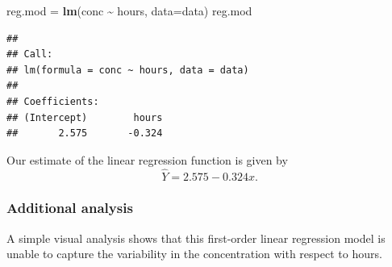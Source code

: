 \documentclass[
]{article}
\newenvironment{Shaded}{\begin{snugshade}}{\end{snugshade}}
\newcommand{\AttributeTok}[1]{\textcolor[rgb]{0.13,0.29,0.53}{#1}}
\newcommand{\DecValTok}[1]{\textcolor[rgb]{0.00,0.00,0.81}{#1}}
\newcommand{\FunctionTok}[1]{\textcolor[rgb]{0.13,0.29,0.53}{\textbf{#1}}}
\newcommand{\NormalTok}[1]{#1}
\newcommand{\OtherTok}[1]{\textcolor[rgb]{0.56,0.35,0.01}{#1}}
\newcommand{\SpecialCharTok}[1]{\textcolor[rgb]{0.81,0.36,0.00}{\textbf{#1}}}
\newcommand{\StringTok}[1]{\textcolor[rgb]{0.31,0.60,0.02}{#1}}
\begin{document}
\begin{Shaded}
\begin{Highlighting}[]
\NormalTok{reg.mod }\OtherTok{=} \FunctionTok{lm}\NormalTok{(conc }\SpecialCharTok{\textasciitilde{}}\NormalTok{ hours, }\AttributeTok{data=}\NormalTok{data)}
\NormalTok{reg.mod}
\end{Highlighting}
\end{Shaded}

\begin{verbatim}
## 
## Call:
## lm(formula = conc ~ hours, data = data)
## 
## Coefficients:
## (Intercept)        hours  
##       2.575       -0.324
\end{verbatim}

Our estimate of the linear regression function is given by \[
  \hat{Y} = 2.575 - 0.324 x.
\]

\hypertarget{additional-analysis}{%
\subsubsection{Additional analysis}\label{additional-analysis}}

A simple visual analysis shows that this first-order linear regression
model is unable to capture the variability in the concentration with
respect to hours.

\begin{Shaded}
\end{Shaded}
\end{document}
